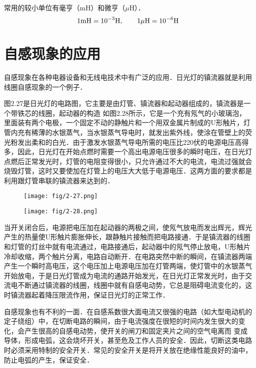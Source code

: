 常用的较小单位有毫亨（mH）和微亨（$\mu$H）．
\[1{\rm mH}=10^{-3}{\rm H},\qquad 1\mu{\rm H}=10^{-6}{\rm H}  \]

\section{自感现象的应用}
自感现象在各种电器设备和无线电技术中有广泛的应用．日光灯的镇流器就是利用线圈自感现象的一个例子．

图2.27是日光灯的电路图，它主要是由灯管、镇流器和起动器组成的，镇流器是一个带铁芯的线圈，起动器的构造
如图2.28所示，它是一个充有氖气的小玻璃泡，里面装有两个电极，一个固定不动的静触片和一个用双金属片制成的U形触片，灯管内充有稀薄的水银蒸气，当水银蒸气导电时，就发出紫外线，使涂在管壁上的荧光粉发出柔和的白光．由于激发水银蒸气导电所需的电压比220伏的电源电压高得多，因此，日光灯在开始点燃时需要一个高出电源电压很多的瞬时电压，在日光灯点燃后正常发光时，灯管的电阻变得很小，只允许通过不大的电流，电流过强就会烧毁灯管，这时又要使加在灯管上的电压大大低于电源电压．这两方面的要求都是利用跟灯管串联的镇流器来达到的．
\begin{figure}[htp]\centering
	\begin{minipage}[t]{0.48\textwidth}
		\centering
		\texttt{[image: fig/2-27.png]}
		\caption{}
	\end{minipage}
	\begin{minipage}[t]{0.48\textwidth}
		\centering
		\texttt{[image: fig/2-28.png]}
		\caption{}
	\end{minipage}
\end{figure}

当开关闭合后，电源把电压加在起动器的两极之间，使氖气放电而发出辉光，辉光产生的热量使U形触片膨胀伸长，跟静触片接触而把电路接通．于是镇流器的线圈和灯管的灯丝中就有电流通过，电路接通后，起动器中的氖气停止放电，U形触片冷却收缩，两个触片分离，电路自动断开．在电路突然中断的瞬间，在镇流器两端产生一个瞬时高电压，这个电压加上电源电压加在灯管两端，使灯管中的水银蒸气开始放电，于是日光灯管成为电流的通路开始发光，在日光灯正常发光时，由于交流电不断通过镇流器的线圈，线圈中就有自感电动势，它总是阻碍电流变化的，这时镇流器起着降压限流作用，保证日光灯的正常工作．

自感现象也有不利的一面．在自感系数很大面电流又很强的电路（如大型电动机的定子绕组）中，在切断电路的瞬间，由于电流强度在很短的时间内发生很大的变化，会产生很高的自感电动势，使开关的闸刀和固定夹片之间的空气电离而
变成导体，形成电弧，这会烧坏开关，甚至危及工作人员的安全．因此，切断这类电路时必须采用特制的安全开关．常见的安全开关是将开关放在绝缘性能良好的油中，防止电弧的产生，保证安全．

